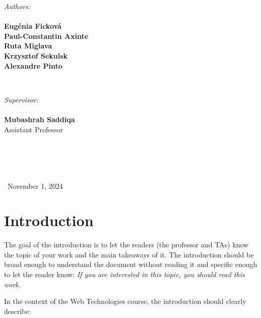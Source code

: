 \documentclass[letterpaper,twocolumn]{article}
\begin{document}
\begin{titlepage}
\begin{minipage}{0.4\textwidth}
\begin{flushleft} \large
\emph{Authors:}
\\\textbf{}
\\\textbf{Eugénia Ficková}
\\\textbf{Paul-Constantin Axinte}
\\\textbf{Ruta Miglava}
\\\textbf{Krzysztof Sekulsk}
\\\textbf{Alexandre Pinto}


\end{flushleft}
\end{minipage}
~
\begin{minipage}{0.4\textwidth}
\begin{flushright} \large
\emph{Supervisor:} 
\\\textbf{}
\\\textbf{Mubashrah Saddiqa}
\\Assistant Professor
\\\textbf{}
\\\textbf{}
\\\textbf{}
\\\textbf{}


\end{flushright}
\end{minipage}\\[3cm]




\centering
\large \ November 1, 2024


\vfill %

\end{titlepage}




\section{Introduction}

The goal of the introduction is to let the readers (the professor and TAs) know the topic of your work and the main takeaways of it.
The introduction should be broad enough to understand the document without reading it and specific enough to let the reader know: \textit{If you are interested in this topic, you should read this work}.

In the context of the Web Technologies course, the introduction should clearly describe:
\end{document}
